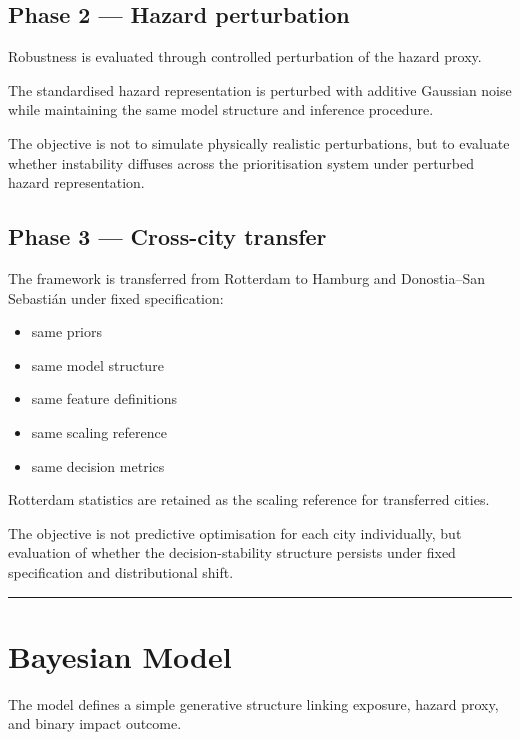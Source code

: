 \documentclass[
]{article}
\providecommand{\tightlist}{%
  \setlength{\itemsep}{0pt}\setlength{\parskip}{0pt}}
\begin{document}
\subsection{Phase 2 — Hazard
perturbation}\label{phase-2-hazard-perturbation}

Robustness is evaluated through controlled perturbation of the hazard
proxy.

The standardised hazard representation is perturbed with additive
Gaussian noise while maintaining the same model structure and inference
procedure.

The objective is not to simulate physically realistic perturbations, but
to evaluate whether instability diffuses across the prioritisation
system under perturbed hazard representation.

\subsection{Phase 3 — Cross-city
transfer}\label{phase-3-cross-city-transfer}

The framework is transferred from Rotterdam to Hamburg and Donostia–San
Sebastián under fixed specification:

\begin{itemize}
\tightlist
\item
  same priors
\item
  same model structure
\item
  same feature definitions
\item
  same scaling reference
\item
  same decision metrics
\end{itemize}

Rotterdam statistics are retained as the scaling reference for
transferred cities.

The objective is not predictive optimisation for each city individually,
but evaluation of whether the decision-stability structure persists
under fixed specification and distributional shift.

\begin{center}\rule{0.5\linewidth}{0.5pt}\end{center}

\section{Bayesian Model}\label{bayesian-model}

The model defines a simple generative structure linking exposure, hazard
proxy, and binary impact outcome.
\end{document}
